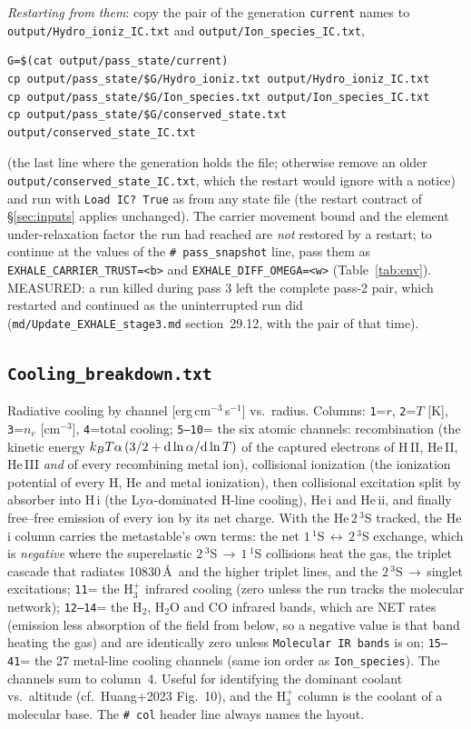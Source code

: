 \documentclass[english,a4paper]{my_memo}
\begin{document}
\emph{Restarting from them}: copy the pair of the generation \texttt{current}
names to \texttt{output/}\allowbreak\texttt{Hydro\_ioniz\_IC.txt} and
\texttt{output/}\allowbreak\texttt{Ion\_species\_IC.txt},
\begin{lstlisting}[style=sh]
G=$(cat output/pass_state/current)
cp output/pass_state/$G/Hydro_ioniz.txt output/Hydro_ioniz_IC.txt
cp output/pass_state/$G/Ion_species.txt output/Ion_species_IC.txt
cp output/pass_state/$G/conserved_state.txt output/conserved_state_IC.txt
\end{lstlisting}
(the last line where the generation holds the file; otherwise remove an older
\texttt{output/conserved\_state\_IC.txt}, which the restart would ignore with
a notice)
and run with \texttt{Load IC?\ True} as from any state file (the restart
contract of \S\ref{sec:inputs} applies unchanged). The carrier movement bound
and the element under-relaxation factor the run had reached are \emph{not}
restored by a restart; to continue at the values of the
\texttt{\# pass\_snapshot} line, pass them as
\texttt{EXHALE\_CARRIER\_TRUST=<b>} and \texttt{EXHALE\_DIFF\_OMEGA=<w>}
(Table~\ref{tab:env}). MEASURED: a run killed during pass 3 left the complete
pass-2 pair, which restarted and continued as the uninterrupted run did
(\texttt{md/Update\_EXHALE\_stage3.md} section~29.12, with the pair of that
time).

\subsection{\texttt{Cooling\_breakdown.txt}}
Radiative cooling by channel [erg\,cm$^{-3}$\,s$^{-1}$] vs.\ radius. Columns:
\texttt{1}=$r$, \texttt{2}=$T$ [K], \texttt{3}=$n_e$ [cm$^{-3}$], \texttt{4}=total
cooling; \texttt{5--10}= the six atomic channels: recombination (the kinetic
energy $k_BT\alpha\,(3/2+{\rm d}\ln\alpha/{\rm d}\ln T)$ of the captured
electrons of H\,II, He\,II, He\,III \emph{and} of every recombining metal ion),
collisional ionization (the ionization potential of every H, He and metal
ionization), then collisional excitation split by absorber into
H\,{\sc i} (the Ly$\alpha$-dominated H-line cooling), He\,{\sc i} and
He\,{\sc ii}, and finally free--free emission of every ion by its net charge.
With the He\,$2\,^3$S tracked, the He\,{\sc i} column carries the metastable's
own terms: the net $1\,^1$S\,$\leftrightarrow$\,$2\,^3$S exchange, which is
\emph{negative} where the superelastic $2\,^3$S\,$\to$\,$1\,^1$S collisions
heat the gas, the triplet cascade that radiates 10830\,\AA\ and the higher
triplet lines, and the $2\,^3$S\,$\to$\,singlet excitations;
\texttt{11}= the H$_3^+$ infrared cooling (zero unless the run
tracks the molecular network); \texttt{12--14}= the H$_2$, H$_2$O and CO
infrared bands, which are NET rates (emission less absorption of the field
from below, so a negative value is that band heating the gas) and are
identically zero unless \texttt{Molecular IR bands} is on;
\texttt{15--41}= the 27 metal-line cooling
channels (same ion order as \texttt{Ion\_species}). The channels sum to
column~4. Useful for identifying the dominant coolant vs.\ altitude (cf.\
Huang+2023 Fig.~10), and the H$_3^+$ column is the coolant of a molecular base.
The \texttt{\# col} header line always names the layout.
\end{document}
